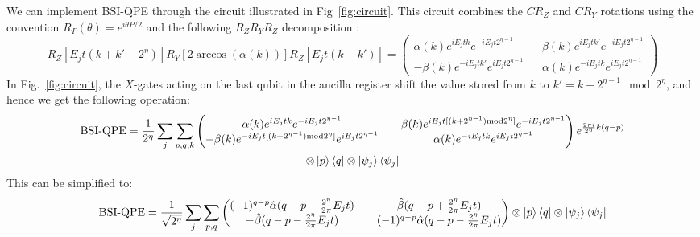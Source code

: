 \documentclass[aps,floatfix,10pt,amssymb,amsfont,amsmath,superscriptaddress,float,nofootinbib,longbibliography,nobalancelastpage,twocolumn]{revtex4-2}
\begin{document}
\begin{widetext}
We can implement BSI-QPE through the circuit illustrated in Fig~\ref{fig:circuit}. This circuit combines the $CR_Z$ and $CR_Y$ rotations using the convention $R_P(\theta)=e^{i\theta P/2}$ and the following $R_ZR_YR_Z$ decomposition \cite{Nielsen_Chuang_2010}:
\begin{equation}
\label{eq:euler}
    R_Z[E_jt(k+k'-2^{\eta})]R_Y[2\arccos(\alpha(k))]R_Z[E_jt(k-k')] = \begin{pmatrix}
        \alpha(k)e^{iE_jtk}e^{-iE_jt2^{\eta-1}} && \beta(k)e^{iE_jt k'}e^{-iE_jt2^{\eta-1}}\\
        -\beta (k)e^{-iE_jt k'}e^{iE_jt2^{\eta-1}} && \alpha(k)e^{-iE_jtk}e^{iE_jt2^{\eta-1}}
    \end{pmatrix}
\end{equation}
In Fig.~\ref{fig:circuit}, the $X$-gates acting on the last qubit in the ancilla register shift the value stored from $k$ to $k'= k+2^{\eta-1} \mod 2^{\eta}$, and hence we get the following operation:
\begin{multline}
        \text{BSI-QPE} = \frac{1}{2^{\eta}}\sum_j\sum_{p,q,k} \begin{pmatrix}
        \alpha(k)e^{iE_jtk}e^{-iE_jt2^{\eta-1}} && \beta(k)e^{iE_jt[(k+2^{\eta-1})\text{mod} 2^{\eta}]}e^{-iE_jt2^{\eta-1}}\\
        -\beta (k)e^{-iE_jt[(k+2^{\eta-1})\text{mod} 2^{\eta}]}e^{iE_jt2^{\eta-1}} && \alpha(k)e^{-iE_jtk}e^{iE_jt2^{\eta-1}}
    \end{pmatrix}e^{\frac{2\pi i}{2^{\eta}}k(q-p)} \\\otimes\ket{p}\bra{q}\otimes\ket{\psi_j}\bra{\psi_j}
\end{multline}
This can be simplified to:
\begin{equation}
    \text{BSI-QPE} = \frac{1}{\sqrt{2^{\eta}}}\sum_j\sum_{p,q} \begin{pmatrix}
        (-1)^{q-p}\hat\alpha(q-p+\frac{2^{\eta}}{2\pi}E_jt) && \hat\beta(q-p+\frac{2^{\eta}}{2\pi}E_jt)\\
        -\hat\beta (q-p-\frac{2^{\eta}}{2\pi}E_jt) && (-1)^{q-p}\hat\alpha(q-p-\frac{2^{\eta}}{2\pi}E_jt)
    \end{pmatrix}\otimes\ket{p}\bra{q}\otimes\ket{\psi_j}\bra{\psi_j}
\end{equation}

\end{widetext}
\end{document}
